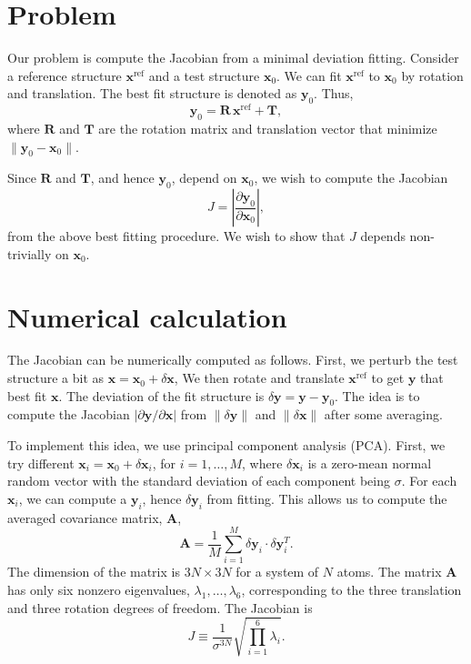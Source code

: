 \documentclass[12pt]{article}
\begin{document}
\newcommand{\vct}[1]{\mathbf{#1}}
\newcommand{\vx}{\vct{x}}
\newcommand{\vxref}{\vct{x}^\mathrm{ref}}
\newcommand{\vy}{\vct{y}}
\newcommand{\vu}{\vct{u}}



\section{Problem}



Our problem is compute the Jacobian from a minimal deviation fitting.
%
Consider a reference structure $\vxref$ and a test structure $\vx_0$.
%
We can fit $\vxref$ to $\vx_0$ by rotation and translation.
%
The best fit structure is denoted as $\vy_0$.
%
Thus,
\[
  \vy_0 = \vct R \, \vxref + \vct T,
\]
where $\vct R$ and $\vct T$
are the rotation matrix and translation vector
that minimize $\| \vy_0 - \vx_0 \|$.


Since $\vct R$ and $\vct T$, and hence $\vy_0$,
depend on $\vx_0$,
we wish to compute the Jacobian
\[
J =
\left| \frac{\partial \vy_0 } { \partial \vx_0 } \right|,
\]
from the above best fitting procedure.
%
We wish to show that $J$ depends non-trivially on $\vx_0$.




\section{Numerical calculation}



The Jacobian can be numerically computed as follows.
%
First, we perturb the test structure a bit
as $\vx = \vx_0 + \delta \vx$,
%
We then rotate and translate $\vxref$ to get $\vy$
that best fit $\vx$.
%
The deviation of the fit structure is $\delta \vy = \vy - \vy_0$.
%
The idea is to compute the Jacobian $|\partial \vy/\partial \vx|$
from $\| \delta \vy \|$ and $\| \delta \vx \|$
after some averaging.



To implement this idea,
we use principal component analysis (PCA).
%
First,
we try different $\vx_i = \vx_0 + \delta \vx_i$, for $i = 1, \dots, M$,
where $\delta \vx_i$ is a zero-mean normal random vector
with the standard deviation of each component being $\sigma$.
%
For each $\vx_i$,
we can compute a $\vy_i$, hence $\delta \vy_i$ from fitting.
%
This allows us to compute the averaged covariance matrix, $\vct A$,
\begin{equation}
  \vct A = \frac{1}{M} \sum_{i = 1}^M \delta \vy_i \cdot \delta \vy_i^T.
\end{equation}
%
The dimension of the matrix is $3N \times 3N$
for a system of $N$ atoms.
%
The matrix $\vct A$ has only six nonzero eigenvalues,
$\lambda_1, \dots, \lambda_6$,
corresponding to the three translation and three rotation degrees of freedom.
%
The Jacobian is
\begin{equation}
J \equiv
\frac { 1 } { \sigma^{3N} }
\sqrt{ \prod_{i = 1}^6 \lambda_i }.
\end{equation}
\end{document}
